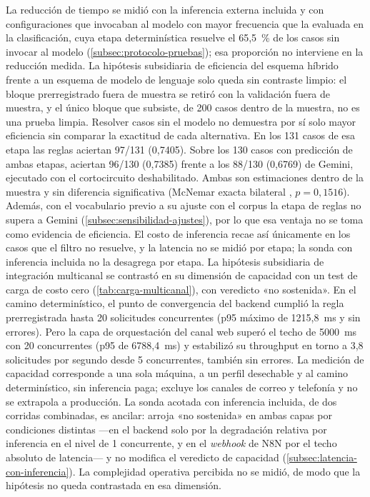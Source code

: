 La reducción de tiempo se midió con la inferencia externa incluida y con configuraciones que invocaban al modelo con mayor frecuencia que la evaluada en la clasificación, cuya etapa determinística resuelve el 65,5~\% de los casos sin invocar al modelo (\autoref{subsec:protocolo-pruebas}); esa proporción no interviene en la reducción medida. La hipótesis subsidiaria de eficiencia del esquema híbrido frente a un esquema de modelo de lenguaje solo queda sin contraste limpio: el bloque prerregistrado fuera de muestra se retiró con la validación fuera de muestra, y el único bloque que subsiste, de 200 casos dentro de la muestra, no es una prueba limpia. Resolver casos sin el modelo no demuestra por sí solo mayor eficiencia sin comparar la exactitud de cada alternativa. En los 131 casos de esa etapa las reglas aciertan 97/131 (0,7405). Sobre los 130 casos con predicción de ambas etapas, aciertan 96/130 (0,7385) frente a los 88/130 (0,6769) de Gemini, ejecutado con el cortocircuito deshabilitado. Ambas son estimaciones dentro de la muestra y sin diferencia significativa (McNemar exacta bilateral \parencite{McNemar1947_sampling_error}, \(p = 0{,}1516\)). Además, con el vocabulario previo a su ajuste con el corpus la etapa de reglas no supera a Gemini (\autoref{subsec:sensibilidad-ajustes}), por lo que esa ventaja no se toma como evidencia de eficiencia. El costo de inferencia recae así únicamente en los casos que el filtro no resuelve, y la latencia no se midió por etapa; la sonda con inferencia incluida no la desagrega por etapa. La hipótesis subsidiaria de integración multicanal se contrastó en su dimensión de capacidad con un test de carga de costo cero (\autoref{tab:carga-multicanal}), con veredicto «no sostenida». En el camino determinístico, el punto de convergencia del backend cumplió la regla prerregistrada hasta 20 solicitudes concurrentes (p95 máximo de 1215,8~ms y sin errores). Pero la capa de orquestación del canal web superó el techo de 5000~ms con 20 concurrentes (p95 de 6788,4~ms) y estabilizó su throughput en torno a 3,8 solicitudes por segundo desde 5 concurrentes, también sin errores. La medición de capacidad corresponde a una sola máquina, a un perfil desechable y al camino determinístico, sin inferencia paga; excluye los canales de correo y telefonía y no se extrapola a producción. La sonda acotada con inferencia incluida, de dos corridas combinadas, es ancilar: arroja «no sostenida» en ambas capas por condiciones distintas —en el backend solo por la degradación relativa por inferencia en el nivel de 1 concurrente, y en el \emph{webhook} de N8N por el techo absoluto de latencia— y no modifica el veredicto de capacidad (\autoref{subsec:latencia-con-inferencia}). La complejidad operativa percibida no se midió, de modo que la hipótesis no queda contrastada en esa dimensión.

